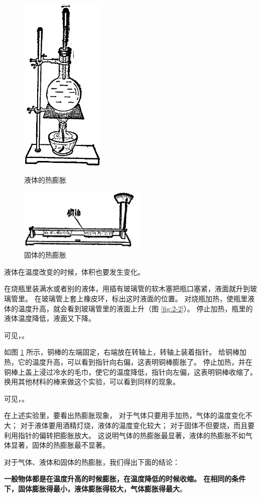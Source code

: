 \begin{figure}[htbp]
    \centering
    \begin{minipage}{6cm}
    \centering
    \includegraphics[width=4cm]{../pic/czwl2-ch2-2}
    \caption{液体的热膨胀}\label{fig:2-2}
    \end{minipage}
    \qquad
    \begin{minipage}{8cm}
    \centering
    \vspace{5.5cm}
    \includegraphics[width=6cm]{../pic/czwl2-ch2-3}
    \caption{固体的热膨胀}\label{fig:2-3}
    \end{minipage}
\end{figure}

液体在温度改变的时候，体积也要发生变化。

在烧瓶里装满水或者别的液体，用插有玻璃管的软木塞把瓶口塞紧，液面就升到玻璃管里。
在玻璃管上套上橡皮环，标出这时液面的位置。
对烧瓶加热，使瓶里液体的温度升高，就会看到玻璃管里的液面上升（图 \ref{fig:2-2}）。
停止加热，瓶里的液体温度降低，液面又下降。

可见，。

如图 \ref{fig:2-3} 所示，铜棒的左端固定，右端放在转轴上，转轴上装着指针。
给铜棒加热，它的温度升高，可以看到指针向右偏，这表明铜棒膨胀了。
停止加热，并在铜棒上盖上浸过冷水的毛巾，使它的温度降低，指针向左偏，这表明铜棒收缩了。
换用其他材料的棒来做这个实验，可以看到同样的现象。

可见，。


在上述实验里，要看出热膨胀现象，
对于气体只要用手加热，气体的温度变化不大；
对于液体要用酒精灯烧，液体的温度变化较大；
对于固体不但要烧，而且要利用指针的偏转把膨胀放大。
这说明气体的热膨胀最显著，液体的热膨胀不如气体显著，固体的热膨胀最不显著。


对于气体、液体和固体的热膨胀，我们得出下面的结论：

\textbf{一般物体都是在温度升高的时候膨胀，在温度降低的时候收缩。
在相同的条件下，固体膨胀得最小，液体膨胀得较大，气体膨胀得最大}。

